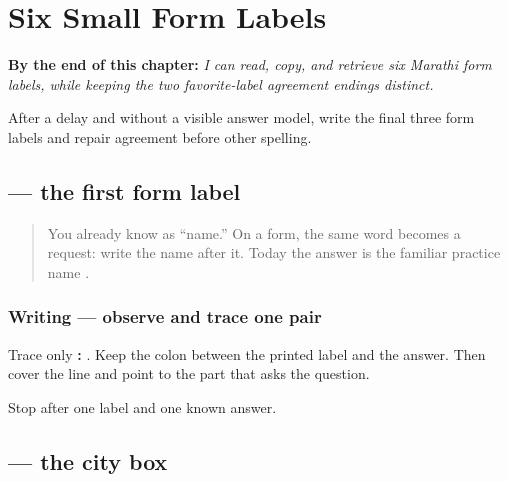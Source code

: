 
\chapter{Six Small Form Labels}
\label{ch:mr-a1-form-labels}

\begin{chapteropening}
\textbf{By the end of this chapter:} \emph{I can read, copy, and retrieve six Marathi form labels, while keeping the two favorite-label agreement endings distinct.}

After a delay and without a visible answer model, write the final three form labels and repair agreement before other spelling.
\end{chapteropening}

\section[nāv: Mīrā]{ — the first form label}

\label{lesson:MR-A1F01-naav}



\begin{quote}
You already know \textbf{} as “name.” On a form, the same word becomes a request: write the name after it. Today the answer is the familiar practice name \textbf{}.
\end{quote}

\subsection*{Writing — observe and trace one pair}
Trace only \textbf{: }. Keep the colon between the printed label and the answer. Then cover the line and point to the part that asks the question.

\begin{tcolorbox}[breakable,colback=teal!4,colframe=teal!35!black,title={Before you move on}]
Stop after one label and one known answer.
\end{tcolorbox}
\section[śahar: Puṇe]{ — the city box}

